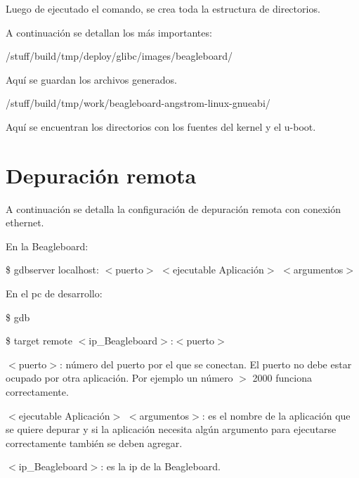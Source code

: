 \bigskip
Luego de ejecutado el comando, se crea toda la estructura de directorios.

\bigskip
A continuación se detallan los más importantes:

\bigskip
/stuff/build/tmp/deploy/glibc/images/beagleboard/ 

Aquí se guardan los archivos generados.

\bigskip
/stuff/build/tmp/work/beagleboard-angstrom-linux-gnueabi/

Aquí se encuentran los directorios con los fuentes del kernel y el u-boot.

\section{Depuración remota}

A continuación se detalla la configuración de depuración remota con conexión ethernet.

\bigskip
En la Beagleboard:    

\bigskip                							
\centerline{\$ gdbserver localhost: $<$puerto$>$ $<$ejecutable Aplicación$>$ $<$argumentos$>$}

\bigskip
En el pc de desarrollo:

\bigskip
\centerline{\$ gdb}

\centerline{\$ target remote $<$ip\_Beagleboard$>$:$<$puerto$>$}

\bigskip
$<$puerto$>$: número del puerto por el que se conectan. El puerto no debe estar ocupado por otra aplicación. Por ejemplo un número $>$ 2000 funciona correctamente.

\bigskip
$<$ejecutable Aplicación$>$ $<$argumentos$>$: es el nombre de la aplicación que se quiere depurar y si la aplicación necesita algún argumento para ejecutarse correctamente también se deben agregar.

\bigskip
$<$ip\_Beagleboard$>$: es la ip de la Beagleboard.